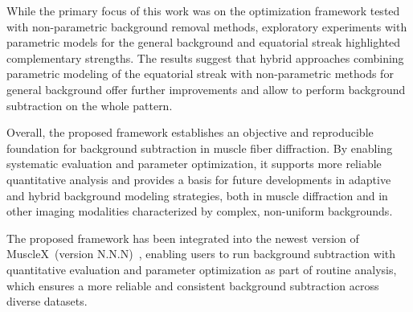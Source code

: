 \documentclass[iucr]{iucrjournals}
\begin{document}

While the primary focus of this work was on the optimization framework tested with non-parametric background removal methods, exploratory experiments with parametric models for the general background and equatorial streak highlighted complementary strengths. The results suggest that hybrid approaches combining parametric modeling of the equatorial streak with non-parametric methods for general background offer further improvements and allow to perform background subtraction on the whole pattern.



Overall, the proposed framework establishes an objective and reproducible foundation for background subtraction in muscle fiber diffraction. By enabling systematic evaluation and parameter optimization, it supports more reliable quantitative analysis and provides a basis for future developments in adaptive and hybrid background modeling strategies, both in muscle diffraction and in other imaging modalities characterized by complex, non-uniform backgrounds.

The proposed framework has been integrated into the newest version of MuscleX~(version N.N.N)~\cite{lee2019musclex}, enabling users to run background subtraction with quantitative evaluation and parameter optimization as part of routine analysis, which ensures a more reliable and consistent background subtraction across diverse datasets. 


\end{document}
